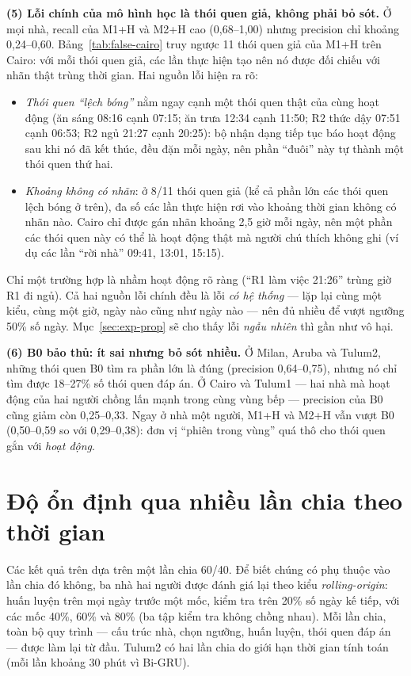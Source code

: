 \textbf{(5) Lỗi chính của mô hình học là thói quen giả, không phải bỏ sót.} Ở mọi nhà, recall của M1+H và
M2+H cao (0,68--1,00) nhưng precision chỉ khoảng 0,24--0,60. Bảng~\ref{tab:false-cairo} truy ngược 11 thói
quen giả của M1+H trên Cairo: với mỗi thói quen giả, các lần thực hiện tạo nên nó được đối chiếu với nhãn
thật trùng thời gian. Hai nguồn lỗi hiện ra rõ:
\begin{itemize}
  \item \emph{Thói quen ``lệch bóng''} nằm ngay cạnh một thói quen thật của cùng hoạt động (ăn sáng 08:16
  cạnh 07:15; ăn trưa 12:34 cạnh 11:50; R2 thức dậy 07:51 cạnh 06:53; R2 ngủ 21:27 cạnh 20:25): bộ nhận dạng
  tiếp tục báo hoạt động sau khi nó đã kết thúc, đều đặn mỗi ngày, nên phần ``đuôi'' này tự thành một thói
  quen thứ hai.
  \item \emph{Khoảng không có nhãn}: ở 8/11 thói quen giả (kể cả phần lớn các thói quen lệch bóng ở trên),
  đa số các lần thực hiện rơi vào khoảng thời gian không có nhãn nào. Cairo chỉ được gán nhãn khoảng 2,5 giờ mỗi ngày, nên một phần các thói quen này có thể
  là hoạt động thật mà người chú thích không ghi (ví dụ các lần ``rời nhà'' 09:41, 13:01, 15:15).
\end{itemize}
Chỉ một trường hợp là nhầm hoạt động rõ ràng (``R1 làm việc 21:26'' trùng giờ R1 đi ngủ). Cả hai nguồn lỗi
chính đều là lỗi \emph{có hệ thống} --- lặp lại cùng một kiểu, cùng một giờ, ngày nào cũng như ngày nào ---
nên đủ nhiều để vượt ngưỡng 50\% số ngày. Mục~\ref{sec:exp-prop} sẽ cho thấy lỗi \emph{ngẫu nhiên} thì gần
như vô hại.



\textbf{(6) B0 bảo thủ: ít sai nhưng bỏ sót nhiều.} Ở Milan, Aruba và Tulum2, những thói quen B0 tìm ra
phần lớn là đúng (precision 0,64--0,75), nhưng nó chỉ tìm được 18--27\% số thói quen đáp án. Ở Cairo và
Tulum1 --- hai nhà mà hoạt động của hai người chồng lấn mạnh trong cùng vùng bếp --- precision của B0 cũng
giảm còn 0,25--0,33. Ngay ở nhà một người, M1+H và M2+H vẫn vượt B0 (0,50--0,59 so với 0,29--0,38): đơn
vị ``phiên trong vùng'' quá thô cho thói quen gắn với \emph{hoạt động}.

\section{Độ ổn định qua nhiều lần chia theo thời gian}
\label{sec:exp-rolling}

Các kết quả trên dựa trên một lần chia 60/40. Để biết chúng có phụ thuộc vào lần chia đó không, ba nhà hai
người được đánh giá lại theo kiểu \emph{rolling-origin}: huấn luyện trên mọi ngày trước một mốc, kiểm tra trên
20\% số ngày kế tiếp, với các mốc 40\%, 60\% và 80\% (ba tập kiểm tra không chồng nhau). Mỗi lần chia, toàn bộ
quy trình --- cấu trúc nhà, chọn ngưỡng, huấn luyện, thói quen đáp án --- được làm lại từ đầu. Tulum2 có hai
lần chia do giới hạn thời gian tính toán (mỗi lần khoảng 30 phút vì Bi-GRU).

